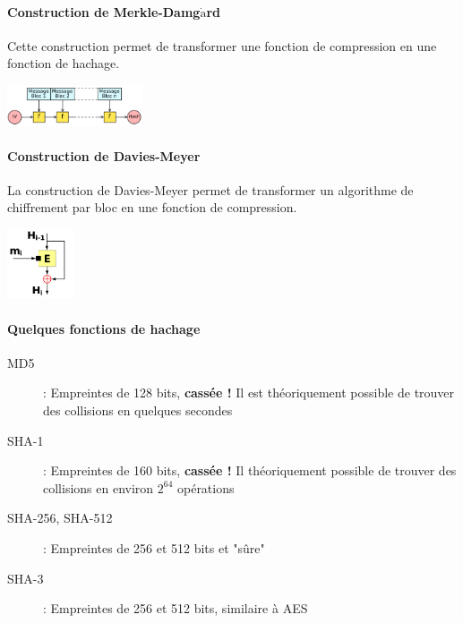\documentclass[11pt,a4paper]{report}
\begin{document}
\paragraph*{Construction de Merkle-Damg$\dot{\text{a}}$rd}

Cette construction permet de transformer une fonction de compression en une fonction de hachage.

\begin{center}
    \includegraphics[width=0.3\textwidth]{img/merkle_damgard.png}
\end{center}

\paragraph*{Construction de Davies-Meyer}

La construction de Davies-Meyer permet de transformer un algorithme de chiffrement par bloc en une fonction de compression.

\begin{center}
    \includegraphics[width=0.15\textwidth]{img/davies_meyer.png}
\end{center}

\paragraph*{Quelques fonctions de hachage}

\begin{description}
    \item[MD5] : Empreintes de 128 bits, \textbf{cassée ! } Il est théoriquement possible de trouver des collisions en quelques secondes
    \item[SHA-1] : Empreintes de 160 bits, \textbf{cassée ! } Il théoriquement possible de trouver des collisions en environ $2^64$ opérations
    \item[SHA-256, SHA-512] : Empreintes de 256 et 512 bits et "sûre"
    \item[SHA-3] : Empreintes de 256 et 512 bits, similaire à AES
\end{description}
\end{document}
